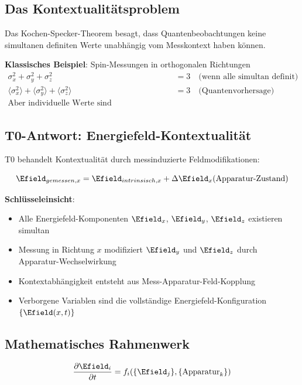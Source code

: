 	\subsection{Das Kontextualitätsproblem}
	
	Das Kochen-Specker-Theorem besagt, dass Quantenbeobachtungen keine simultanen definiten Werte unabhängig vom Messkontext haben können.
	
	\textbf{Klassisches Beispiel}: Spin-Messungen in orthogonalen Richtungen
	\begin{align}
		\sigma_x^2 + \sigma_y^2 + \sigma_z^2 &= 3 \quad \text{(wenn alle simultan definit)} \\
		\langle\sigma_x^2\rangle + \langle\sigma_y^2\rangle + \langle\sigma_z^2\rangle &= 3 \quad \text{(Quantenvorhersage)} \\
		\text{Aber individuelle Werte sind kontextabhängig!}
	\end{align}
	
	\subsection{T0-Antwort: Energiefeld-Kontextualität}
	
	T0 behandelt Kontextualität durch messinduzierte Feldmodifikationen:
	
	\begin{equation}
		\Efield_{gemessen,x} = \Efield_{intrinsisch,x} + \Delta\Efield_x(\text{Apparatur-Zustand})
	\end{equation}
	
	\textbf{Schlüsseleinsicht}: 
	\begin{itemize}
		\item Alle Energiefeld-Komponenten $\Efield_x$, $\Efield_y$, $\Efield_z$ existieren simultan
		\item Messung in Richtung $x$ modifiziert $\Efield_y$ und $\Efield_z$ durch Apparatur-Wechselwirkung
		\item Kontextabhängigkeit entsteht aus Mess-Apparatur-Feld-Kopplung
		\item Verborgene Variablen sind die vollständige Energiefeld-Konfiguration $\{\Efield(x,t)\}$
	\end{itemize}
	
	\subsection{Mathematisches Rahmenwerk}
	
	\begin{equation}
		\frac{\partial \Efield_i}{\partial t} = f_i(\{\Efield_j\}, \{\text{Apparatur}_k\})
	\end{equation}
	
